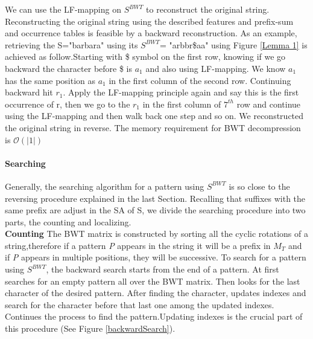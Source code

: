 \documentclass[11pt,a4paper]{report}
\begin{document}
We can use the LF-mapping on $S^{ BWT}$ to reconstruct
the original string. 
Reconstructing the original string using the 
described features and prefix-sum and 
occurrence tables is feasible by a backward 
reconstruction.
As an example, retrieving the S="barbara"
using its $S^{BWT}$= "arbbr\$aa" using Figure 
\ref {Lemma 1} is achieved as follow.Starting
with \$ symbol on the first row, knowing if 
we go backward the character before \$ is 
$a_1$ and also using LF-mapping. We know  
$a_1$ has the same position as $a_1$ in 
the first column of the second row. Continuing 
backward hit $r_1$. Apply the LF-mapping principle 
again and say this is the first occurrence of r, 
then we go to the  $r_1$ in the first column of 
$7^{th}$ row and continue using the LF-mapping 
and then walk back one step and so on. We 
reconstructed the original string in reverse. 
The memory requirement for BWT decompression is  
$\mathcal{O}(\lvert 1 \rvert)$ \\




\paragraph{Searching}
Generally, the searching algorithm for a pattern using
 $S^{BWT}$ is so close to the reversing procedure 
explained in the last Section.
Recalling that suffixes with the same prefix are adjust
in the SA of S, we divide the searching procedure into
two parts, the counting and localizing.\\

\textbf{Counting}
The BWT matrix is constructed by sorting all the cyclic
rotations of a string,therefore if a pattern \emph{P} 
appears in the string it will be a prefix in $M_{T}$ 
and if \emph {P} appears in multiple positions, they 
will be successive.
To search for a pattern using $S^{BWT}$, the backward 
search starts from the end of a pattern.
At first searches for an empty  pattern all over the 
BWT matrix. Then looks for the last character of the 
desired pattern. After finding the character, updates 
indexes and search for the character before that last 
one among the updated indexes. Continues the process 
to find the pattern.Updating indexes is the crucial 
part of this procedure (See Figure \ref{backwardSearch}).\\\\
\end{document}
